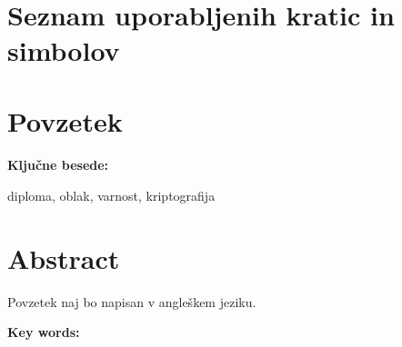 \documentclass[12pt,a4paper,openany]{book}
\begin{document}
\newpage



\ \thispagestyle{empty}

\newpage


\renewcommand\thepage{} 
\tableofcontents
\renewcommand\thepage{\arabic{page}}

\thispagestyle{empty}



\chapter*{Seznam uporabljenih kratic in simbolov}
\thispagestyle{empty}

\printglossaries


\clearpage{\pagestyle{empty}\cleardoublepage}


\setcounter{page}{1}

\chapter*{Povzetek}



\vspace{1.3cm}
\noindent
{\large \bf Ključne besede:}

\vspace{0.5cm}
\noindent
diploma, oblak, varnost, kriptografija


\chapter*{Abstract}


Povzetek naj bo napisan v angleškem jeziku.

\vspace{1.3cm}
\noindent
{\large \bf Key words:}
\end{document}
